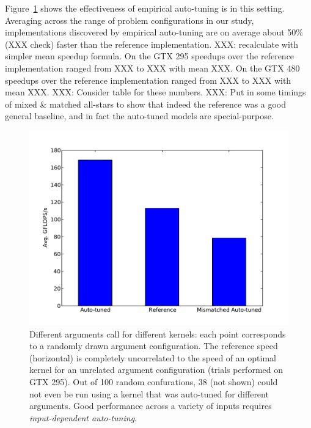 \documentclass{sig-alternate}
\begin{document}
Figure~\ref{fig:speedup} shows the effectiveness of empirical auto-tuning is in this setting.  Averaging across the range of problem configurations in our study,
implementations discovered by empirical auto-tuning are on average about 50\% (XXX check) faster than the reference implementation.
XXX: recalculate with simpler mean speedup formula.
On the GTX 295 speedups over the reference implementation ranged from XXX to XXX with mean XXX.
On the GTX 480 speedups over the reference implementation ranged from XXX to XXX with mean XXX.
XXX: Consider table for these numbers.
XXX: Put in some timings of mixed \& matched all-stars to show that indeed the reference was a good general baseline, and in fact the auto-tuned models are special-purpose.
\begin{figure}
\centering
\includegraphics[scale=.42]{allstars_mixup_295.pdf}
\caption{Different arguments call for different kernels: each point corresponds to a randomly drawn argument configuration.
The reference speed (horizontal) is completely uncorrelated to the speed of an optimal kernel for an unrelated argument configuration (trials performed on GTX 295).
Out of 100 random confurations, 38 (not shown) could not even be run using a kernel that was auto-tuned for different arguments.
Good performance across a variety of inputs requires {\em input-dependent auto-tuning}.
}
\label{fig:speedup}
\end{figure}
\end{document}
